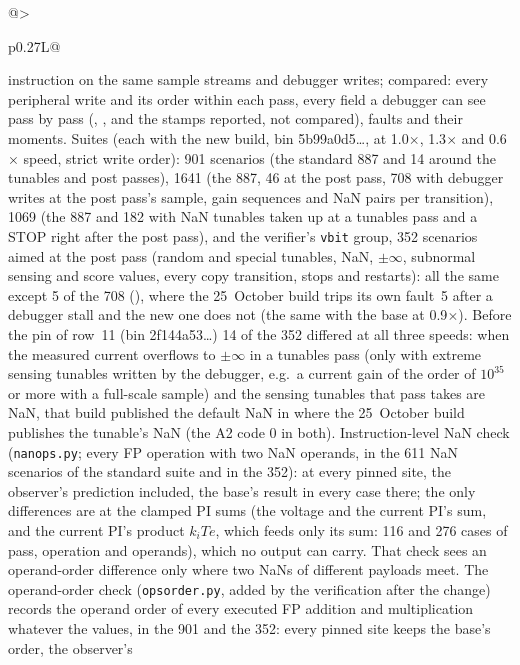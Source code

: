 \documentclass[11pt]{article}
\newcommand{\code}[1]{\texttt{\detokenize{#1}}}
\begin{document}
{\begin{xltabular}{\linewidth}{@{}>{\raggedright\arraybackslash}p{0.27\linewidth}L@{}}
    instruction on the same sample streams and debugger writes; compared:
    every peripheral write and its order within each pass, every
    \code{g_buck} field a debugger can see pass by pass (\code{busy_max},
    \code{bench}, \code{rst_cause} and the stamps reported, not compared),
    faults and their moments. Suites (each with the new build, bin
    5b99a0d5\ldots, at 1.0$\times$, 1.3$\times$ and 0.6$\times$ speed,
    strict write order): 901 scenarios (the standard 887 and 14 around the
    tunables and post passes), 1641 (the 887, 46 at the post pass, 708
    with debugger writes at the post pass's sample, gain sequences and NaN
    pairs per transition), 1069 (the 887 and 182 with NaN tunables taken
    up at a tunables pass and a STOP right after the post pass), and the
    verifier's \texttt{vbit} group, 352 scenarios aimed at the post pass
    (random and special tunables, NaN, $\pm\infty$, subnormal sensing and
    score values, every copy transition, stops and restarts): all the same
    except 5 of the 708 (\code{vt_tr_stall_*}), where the 25~October
    build trips its own fault~5 after a debugger stall and the new one
    does not (the same with the base at 0.9$\times$). Before the pin of
    row~11 (bin 2f144a53\ldots) 14 of the 352 differed at all three
    speeds: when the measured current overflows to $\pm\infty$ in a
    tunables pass (only with extreme sensing tunables written by the
    debugger, e.g.\ a current gain of the order of $10^{35}$ or more with a
    full-scale sample) and the sensing tunables that pass takes are NaN,
    that build published the default NaN in \code{out.i_load} where the
    25~October build publishes the tunable's NaN (the A2 code 0 in both).
    Instruction-level NaN check (\texttt{nanops.py}; every FP operation
    with two NaN operands, in the 611 NaN scenarios of the standard suite
    and in the 352): at every pinned site, the observer's prediction
    included, the base's result in every case there; the only differences
    are at the clamped PI sums (the voltage and the current PI's sum, and
    the current PI's product $k_i T e$, which feeds only its sum: 116 and
    276 cases of pass, operation and operands), which no output can
    carry. That check sees an operand-order
    difference only where two NaNs of different payloads meet. The
    operand-order check (\texttt{opsorder.py}, added by the verification
    after the change) records the operand order of every executed FP
    addition and multiplication whatever the values, in the 901 and the
    352: every pinned site keeps the base's order, the observer's

\end{xltabular}}
\end{document}
